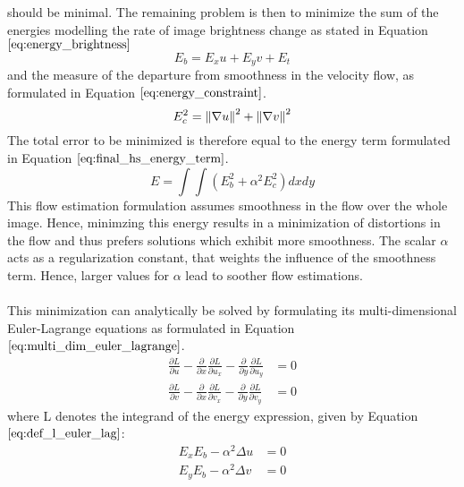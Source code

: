 should be minimal. The remaining problem is then to minimize the sum of the energies modelling the rate of image brightness change as stated in Equation $\ref{eq:energy_brightness}$
\begin{equation}
	E_b = E_x u + E_y v + E_t
\label{eq:energy_brightness}
\end{equation}
and the measure of the departure from smoothness in the velocity flow, as formulated in Equation $\ref{eq:energy_constraint}$.
\begin{equation}
	E_c^2 = \left\lVert\nabla u\right\rVert^2 + \left\lVert\nabla v\right\rVert^2
\label{eq:energy_constraint}
\end{equation}
The total error to be minimized is therefore equal to the energy term formulated in Equation $\ref{eq:final_hs_energy_term}$.
\begin{equation}
	E = \int \int \left( E_b^2 + \alpha^2 E_c^2 \right) dx dy
\label{eq:final_hs_energy_term}
\end{equation}
This flow estimation formulation assumes smoothness in the flow over the whole image. Hence, minimzing this energy results in a minimization of distortions in the flow and thus prefers solutions which exhibit more smoothness. The scalar $\alpha$ acts as a regularization constant, that weights the influence of the smoothness term. Hence, larger values for $\alpha$ lead to soother flow estimations. \\ \\
This minimization can analytically be solved by formulating its multi-dimensional Euler-Lagrange equations as formulated in Equation $\ref{eq:multi_dim_euler_lagrange}$.
\begin{equation}
\begin{aligned}
 \frac{\partial L}{\partial u} - \frac{\partial}{\partial x} \frac{\partial L}{\partial u_x} - \frac{\partial}{\partial y}\frac{\partial L}{\partial u_y} &= 0 \\
\frac{\partial L}{\partial v} - \frac{\partial}{\partial x} \frac{\partial L}{\partial v_x} - \frac{\partial}{\partial y}\frac{\partial L}{\partial v_y} &= 0  
\end{aligned}
\label{eq:multi_dim_euler_lagrange}
\end{equation}
where L denotes the integrand of the energy expression, given by Equation $\ref{eq:def_l_euler_lag}$:
\begin{equation}
\begin{aligned}
E_x E_b - \alpha^2 \Delta u &= 0 \\
E_y E_b - \alpha^2 \Delta v &= 0 \\
\end{aligned}
\label{eq:def_l_euler_lag}
\end{equation}
